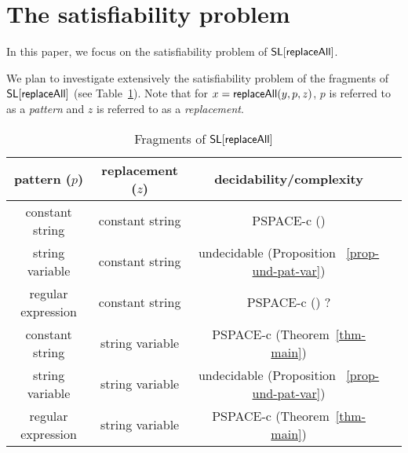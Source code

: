 \begin{example}
\end{example}




\section{The satisfiability problem} 
In this paper, we focus on the satisfiability problem of $\mathsf{SL}[\mathsf{replaceAll}]$.

\smallskip

\begin{quote}
\end{quote}
\smallskip

We plan to investigate extensively the satisfiability problem of the fragments of $\mathsf{SL}[\mathsf{replaceAll}]$ (see Table~\ref{tab-sum}). Note that for $x=\mathsf{replaceAll} (y, p, z)$, $p$ is referred to as a \emph{pattern} and $z$ is referred to as a \emph{replacement}.

\begin{table}[htbp]
\begin{tabular}{|c|c|c|c}
\hline
pattern ($p$)  &   replacement ($z$)        & decidability/complexity \\
\hline
constant string  &   constant   string                    & PSPACE-c (\cite{LB16})     \\
\hline
string variable &   constant   string                    &  undecidable (Proposition ~\ref{prop-und-pat-var})    \\
\hline
regular expression  &   constant string                      &    PSPACE-c (\cite{LB16}) ?     \\

\hline
constant string  &   string variable                       & PSPACE-c (Theorem~\ref{thm-main})       \\

\hline
string variable  &   string variable                       & undecidable   (Proposition ~\ref{prop-und-pat-var})   \\

\hline
regular expression  &   string variable                       &      PSPACE-c (Theorem~\ref{thm-main})      \\
\hline
\end{tabular}
\caption{Fragments of $\mathsf{SL}[\mathsf{replaceAll}]$}\label{tab-sum}
\end{table}

